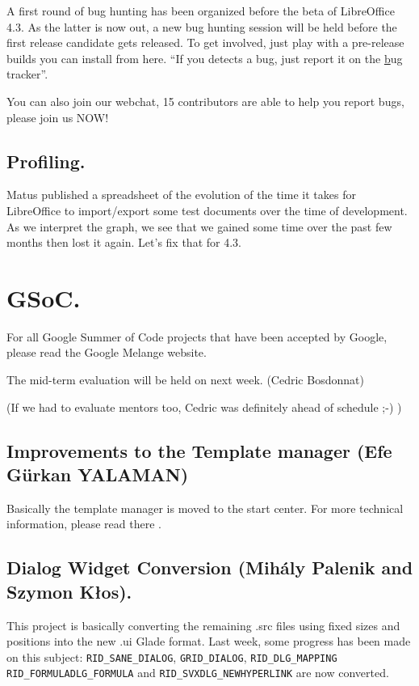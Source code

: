 \documentclass{article}
\begin{document}
A first round of bug hunting has been organized before the beta of LibreOffice 4.3. As the latter is now out, a new bug hunting session will be held before the first release candidate gets released. To get involved, just play with a pre-release builds you can install from here\cite{preReleaseLink}. ``If you detects a bug, just report it on the \hyperref[bugTracker]bug tracker''\cite{bugHuntingRc11}\cite{bugHuntingRc12}.

You can also join our webchat, 15 contributors are able to help you report bugs, please join us NOW!\cite{qaWebchat}

\subsection{Profiling.}

Matus published a spreadsheet of the evolution of the time it takes for LibreOffice to import/export some test documents over the time of development. As we interpret the graph, we see that we gained some time over the past few months then lost it again. Let's fix that for 4.3.\cite{profiling} 



\section{GSoC.}

For all Google Summer of Code projects that have been accepted by Google, please read the Google Melange website\cite{gsocLink}.

The mid-term evaluation will be held on next week. (Cedric Bosdonnat)

(If we had to evaluate mentors too, Cedric was definitely ahead of schedule ;-) \cite{gsocMidTermEval})

\subsection{Improvements to the Template manager (Efe Gürkan YALAMAN)}

Basically the template manager is moved to the start center. For more technical information, please read there \cite{gsocTemplateManager}.

\subsection{Dialog Widget Conversion (Mihály Palenik and Szymon Kłos).}

\label{dialogWidgetConversion}
This project is basically converting the remaining .src files using fixed sizes and positions into the new .ui Glade format. Last week, some progress has been made on this subject: \lstinline|RID_SANE_DIALOG|, \lstinline|GRID_DIALOG|, \lstinline|RID_DLG_MAPPING| \lstinline|RID_FORMULADLG_FORMULA| and \lstinline|RID_SVXDLG_NEWHYPERLINK| are now converted\cite{gsocDialogWidgetWeek4}.
\end{document}
